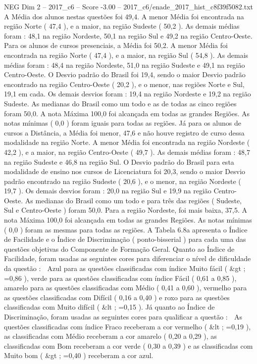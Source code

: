 \begin{textsample}{NEG Dim 2 – 2017\_c6 – Score -3.00 – 2017\_c6/enade\_2017\_hist\_c8f39f5082.txt}
A Média dos alunos nestas questões foi 49,4.
A menor Média foi encontrada na região Norte ( 47,4 ), e a maior, na região Sudeste ( 50,2 ).
As demais médias foram : 48,1 na região Nordeste, 50,1 na região Sul e 49,2 na região Centro-Oeste.
Para os alunos de cursos presenciais, a Média foi 50,2.
A menor Média foi encontrada na região Norte ( 47,4 ), e a maior, na região Sul ( 54,8 ).
As demais médias foram : 48,4 na região Nordeste, 51,0 na região Sudeste e 49,1 na região Centro-Oeste.
O Desvio padrão do Brasil foi 19,4, sendo o maior Desvio padrão encontrado na região Centro-Oeste ( 20,2 ), e o menor, nas regiões Norte e Sul, 19,1 em cada.
Os demais desvios foram : 19,4 na região Nordeste e 19,2 na região Sudeste.
As medianas do Brasil como um todo e as de todas as cinco regiões foram 50,0.
A nota Máxima 100,0 foi alcançada em todas as grandes Regiões.
As notas mínimas ( 0,0 ) foram iguais para todas as regiões.
Já para os alunos de cursos a Distância, a Média foi menor, 47,6 e não houve registro de curso dessa modalidade na região Norte.
A menor Média foi encontrada na região Nordeste ( 42,2 ), e a maior, na região Centro-Oeste ( 49,7 ).
As demais médias foram : 48,7 na região Sudeste e 46,8 na região Sul.
O Desvio padrão do Brasil para esta modalidade de ensino nos cursos de Licenciatura foi 20,3, sendo o maior Desvio padrão encontrado na região Sudeste ( 20,6 ), e o menor, na região Nordeste ( 19,7 ).
Os demais desvios foram : 20,0 na região Sul e 19,9 na região Centro-Oeste.
As medianas do Brasil como um todo e para três das regiões ( Sudeste, Sul e Centro-Oeste ) foram 50,0.
Para a região Nordeste, foi mais baixa, 37,5.
A nota Máxima 100,0 foi alcançada em todas as grandes Regiões.
As notas mínimas ( 0,0 ) foram as mesmas para todas as regiões.
A Tabela 6.8a apresenta o Índice de Facilidade e o Índice de Discriminação ( ponto-bisserial ) para cada uma das questões objetivas do Componente de Formação Geral.
Quanto ao Índice de Facilidade, foram usadas as seguintes cores para diferenciar o nível de dificuldade da questão :  Azul para as questões classificadas com índice Muito fácil ( \&gt ; =0,86 ), verde para as questões classificadas com índice Fácil ( 0,61 a 0,85 ), amarelo para as questões classificadas com Médio ( 0,41 a 0,60 ), vermelho para as questões classificadas com Difícil ( 0,16 a 0,40 ) e roxo para as questões classificadas com Muito difícil ( \&lt ; =0,15 ).
Já quanto ao Índice de Discriminação, foram usadas as seguintes cores para qualificar a questão :  As questões classificadas com índice Fraco receberam a cor vermelho ( \&lt ; =0,19 ), as classificadas com Médio receberam a cor amarelo ( 0,20 a 0,29 ), as classificadas com Bom receberam a cor verde ( 0,30 a 0,39 ) e as classificadas com Muito bom ( \&gt ; =0,40 ) receberam a cor azul.

\end{textsample}
